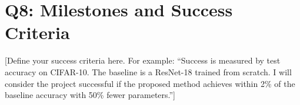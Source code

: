 \documentclass[11pt, letterpaper]{article}
\begin{document}
\section*{Q8: Milestones and Success Criteria}

[Define your success criteria here. For example: ``Success is measured by test accuracy on CIFAR-10. The baseline is a ResNet-18 trained from scratch. I will consider the project successful if the proposed method achieves within 2\% of the baseline accuracy with 50\% fewer parameters.'']







\end{document}
